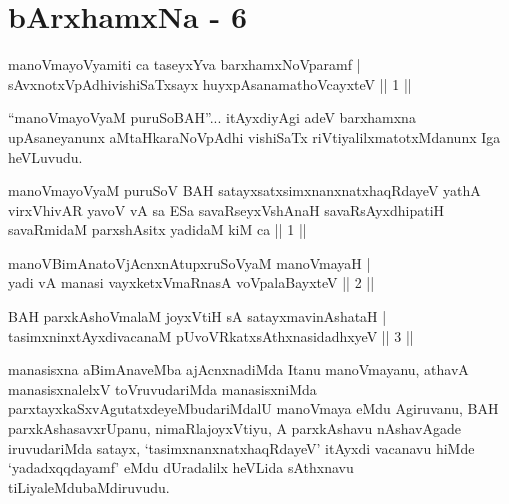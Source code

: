\chapter{bArxhamxNa - 6}

\begin{shl}
manoVmayoV\s yamiti ca taseyxYva barxhamxNoV\s paramf | \\
sAvxnotxVpAdhivishiSaTxsayx huyxpAsanamathoVcayxteV \hfill ||  1 || 
\end{shl}

\begin{artha}
``manoVmayoV\s yaM puruSoBAH''... itAyxdiyAgi adeV barxhamxna upAsaneyanunx aMtaHkaraNoVpAdhi vishiSaTx riVtiyalilx\break matotxMdanunx Iga heVLuvudu.
\end{artha}


\begin{kandikeshl}
manoVmayoV\s yaM puruSoV BAH satayxsatxsimxnanxnatxhaqRdayeV yathA virxVhivAR yavoV vA sa ESa savaRseyxVshAnaH savaRsAyxdhipatiH savaRmidaM parxshAsitx yadidaM kiM ca || 1 ||
\end{kandikeshl}


\begin{shl}
manoVBimAnatoV\s jAcnxnAtupxruSoV\s yaM manoVmayaH | \\
yadi vA manasi vayxketxVmaRnasA voVpalaBayxteV \hfill ||  2 || 
\end{shl}

\begin{shl}
BAH parxkAshoV\s malaM joyxVtiH sA satayxmavinAshataH  | \\
tasimxninxtAyxdivacanaM pUvoVRkatxsAthxnasidadhxyeV \hfill ||  3 || 
\end{shl}

\begin{artha}
manasisxna aBimAnaveMba ajAcnxnadiMda Itanu manoVmayanu, athavA manasisxnalelxV toVruvudariMda manasisxniMda parxtayxkaSxvAgutatxdeyeMbudariMdalU manoVmaya eMdu Agiruvanu, BAH parxkAsha\-\break savxrUpanu, nimaRlajoyxVtiyu, A parxkAshavu nAshavAgade iruvudariMda satayx, `tasimxnanxnatxhaqRdayeV' itAyxdi vacanavu hiMde `yadadxqqdayamf' eMdu dUradalilx heVLida sAthxnavu tiLiyaleMdu\break baMdiruvudu.
\end{artha}

